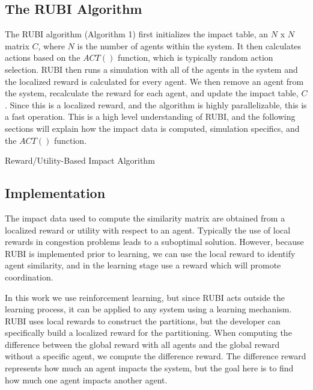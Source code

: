 \documentclass[letterpaper]{article}
\begin{document}
\subsection{The RUBI Algorithm}
The RUBI algorithm (Algorithm 1) first initializes the impact table, an $N$ x $N$ matrix $C$, where $N$ is the number of agents within the system. It then calculates actions based on the $ACT()$ function, which is typically random action selection. RUBI then runs a simulation with all of the agents in the system and the localized reward is calculated for every agent. We then remove an agent from the system, recalculate the reward for each agent, and update the impact table, $C$. Since this is a localized reward, and the algorithm is highly parallelizable, this is a fast operation. This is a high level understanding of RUBI, and the following sections will explain how the impact data is computed, simulation specifics, and the $ACT()$ function.
\begin{algorithm} \label{alg:RUBI}
  \caption{Reward/Utility-Based Impact Algorithm}
  \begin{algorithmic}[1]
    \Statex
				\EndFor
		\EndFor
	\EndFor        
    \EndFunction
  \end{algorithmic}
\end{algorithm}

\subsection{Implementation}
The impact data used to compute the similarity matrix are obtained from a localized reward or utility with respect to an agent. Typically the use of local rewards in congestion problems leads to a suboptimal solution. However, because RUBI is implemented prior to learning, we can use the local reward to identify agent similarity, and in the learning stage use a reward which will promote coordination.

In this work we use reinforcement learning, but since RUBI acts outside the learning process, it can be applied to any system using a learning mechanism. RUBI uses local rewards to construct the partitions, but the developer can specifically build a localized reward for the partitioning. When computing the difference between the global reward with all agents and the global reward without a specific agent, we compute the difference reward. The difference reward represents how much an agent impacts the system, but the goal here is to find how much one agent impacts another agent.
\end{document}
